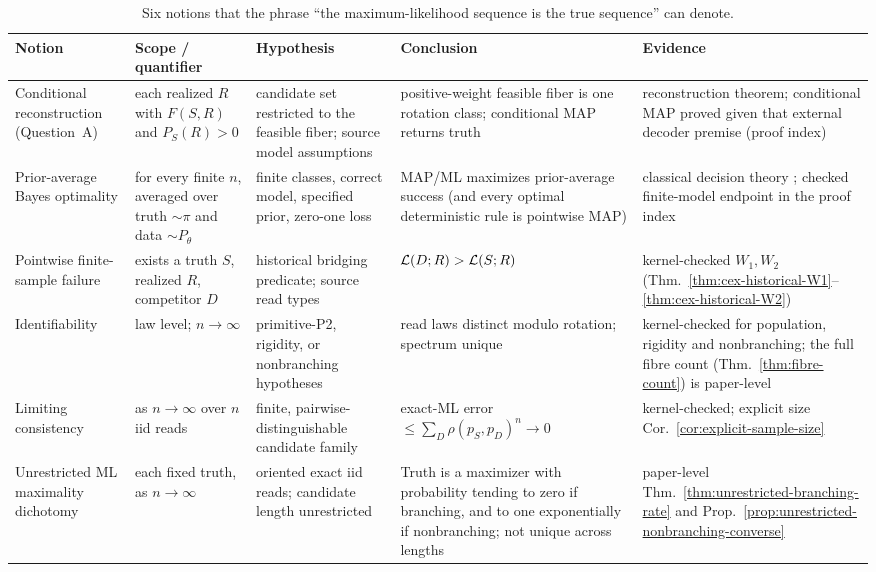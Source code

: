 \begin{table}[!htbp]
\centering
\small
\setlength{\tabcolsep}{4pt}
\caption{Six notions that the phrase ``the maximum-likelihood sequence is the
true sequence'' can denote.}
\label{tab:claims}
\begin{tabular}{@{}>{\raggedright\arraybackslash}p{}>{\raggedright\arraybackslash}p{}>{\raggedright\arraybackslash}p{}>{\raggedright\arraybackslash}p{}>{\raggedright\arraybackslash}p{}@{}}
\toprule
Notion & Scope / quantifier & Hypothesis & Conclusion & Evidence\\
\midrule
Conditional reconstruction (Question~A)
  & each realized $R$ with $F(S,R)$ and $P_S(R)>0$
  & candidate set restricted to the feasible fiber; source model assumptions
  & positive-weight feasible fiber is one rotation class; conditional MAP returns truth
  & 2016 reconstruction theorem; conditional MAP proved given that
    external decoder premise (proof index)\\
\addlinespace
Prior-average Bayes optimality
  & for every finite $n$, averaged over truth $\sim\pi$ and data $\sim P_\theta$
  & finite classes, correct model, specified prior, zero-one loss
  & MAP/ML maximizes prior-average success (and every optimal deterministic rule is pointwise MAP)
  & classical decision theory \parencite{berger1985};
    checked finite-model endpoint in the proof index\\
\addlinespace
Pointwise finite-sample failure
  & exists a truth $S$, realized $R$, competitor $D$
  & historical bridging predicate; source read types
  & $\mathcal{L}(D;R)>\mathcal{L}(S;R)$
  & kernel-checked $W_1,W_2$ (Thm.~\ref{thm:cex-historical-W1}--\ref{thm:cex-historical-W2})\\
\addlinespace
Identifiability
  & law level; $n\to\infty$
  & primitive-P2, rigidity, or nonbranching hypotheses
  & read laws distinct modulo rotation; spectrum unique
  & kernel-checked for population, rigidity and nonbranching;
    the full fibre count (Thm.~\ref{thm:fibre-count}) is paper-level\\
\addlinespace
Limiting consistency
  & as $n\to\infty$ over $n$ iid reads
  & finite, pairwise-distinguishable candidate family
  & exact-ML error $\le\sum_{D}\rho(p_S,p_D)^n\to0$
  & kernel-checked; explicit size Cor.~\ref{cor:explicit-sample-size}\\
\addlinespace
Unrestricted ML maximality dichotomy
  & each fixed truth, as $n\to\infty$
  & oriented exact iid reads; candidate length unrestricted
  & Truth is a maximizer with probability tending to zero if branching,
    and to one exponentially if nonbranching; not unique across lengths
  & paper-level Thm.~\ref{thm:unrestricted-branching-rate} and
    Prop.~\ref{prop:unrestricted-nonbranching-converse}\\
\bottomrule
\end{tabular}
\end{table}

